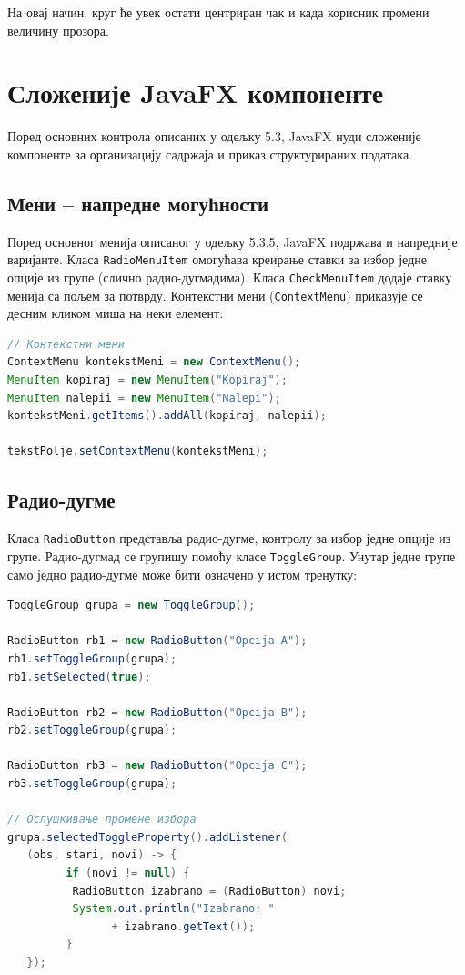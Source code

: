 На овај начин, круг ће увек остати центриран чак и када корисник промени величину прозора.


\section{Сложеније JavaFX компоненте}

Поред основних контрола описаних у одељку 5.3, JavaFX нуди сложеније компоненте за организацију садржаја и приказ структурираних података.


\subsection{Мени – напредне могућности}

Поред основног менија описаног у одељку 5.3.5, JavaFX подржава и напредније варијанте. Класа \texttt{RadioMenuItem} омогућава креирање ставки за избор једне опције из групе (слично радио-дугмадима). Класа \texttt{CheckMenuItem} додаје ставку менија са пољем за потврду. Контекстни мени (\texttt{ContextMenu}) приказује се десним кликом миша на неки елемент:


\begin{lstlisting}[language=Java]
// Контекстни мени
ContextMenu kontekstMeni = new ContextMenu();
MenuItem kopiraj = new MenuItem("Kopiraj");
MenuItem nalepii = new MenuItem("Nalepi");
kontekstMeni.getItems().addAll(kopiraj, nalepii);
 
tekstPolje.setContextMenu(kontekstMeni);
\end{lstlisting}


\subsection{Радио-дугме}

Класа \texttt{RadioButton} представља радио-дугме, контролу за избор једне опције из групе. Радио-дугмад се групишу помоћу класе \texttt{ToggleGroup}. Унутар једне групе само једно радио-дугме може бити означено у истом тренутку:


\begin{lstlisting}[language=Java]
ToggleGroup grupa = new ToggleGroup();
 
RadioButton rb1 = new RadioButton("Opcija A");
rb1.setToggleGroup(grupa);
rb1.setSelected(true);
 
RadioButton rb2 = new RadioButton("Opcija B");
rb2.setToggleGroup(grupa);
 
RadioButton rb3 = new RadioButton("Opcija C");
rb3.setToggleGroup(grupa);
 
// Ослушкивање промене избора
grupa.selectedToggleProperty().addListener(
   (obs, stari, novi) -> {
         if (novi != null) {
          RadioButton izabrano = (RadioButton) novi;
          System.out.println("Izabrano: "
                + izabrano.getText());
         }
   });
\end{lstlisting}


